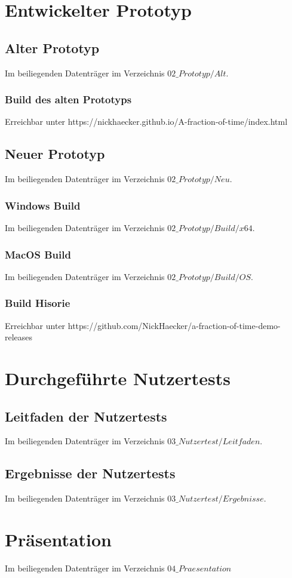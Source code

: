 \documentclass[
	12pt,
	a4paper,
	bibtotoc,
	cleardoubleempty, 
	idxtotoc,
	ngerman,
	openright
	final,
	listof=nochaptergap,
	]{scrbook}
\begin{document}
\begin{appendices}
\section{Entwickelter Prototyp}
\subsection{Alter Prototyp}
Im beiliegenden Datenträger im Verzeichnis $02\_Prototyp/Alt$.
\subsubsection{Build des alten Prototyps}
Erreichbar unter https://nickhaecker.github.io/A-fraction-of-time/index.html
\subsection{Neuer Prototyp}
Im beiliegenden Datenträger im Verzeichnis $02\_Prototyp/Neu$.
\subsubsection{Windows Build}
Im beiliegenden Datenträger im Verzeichnis $02\_Prototyp/Build/x64$.
\subsubsection{MacOS Build}
Im beiliegenden Datenträger im Verzeichnis $02\_Prototyp/Build/OS$.
\subsubsection{Build Hisorie}
Erreichbar unter https://github.com/NickHaecker/a-fraction-of-time-demo-releases
\section{Durchgeführte Nutzertests}
\subsection{Leitfaden der Nutzertests}
Im beiliegenden Datenträger im Verzeichnis $03\_Nutzertest/Leitfaden$.
\subsection{Ergebnisse der Nutzertests}
Im beiliegenden Datenträger im Verzeichnis $03\_Nutzertest/Ergebnisse$.
\section{Präsentation}
Im beiliegenden Datenträger im Verzeichnis $04\_Praesentation$ 
\newpage

\end{appendices}
\end{document}
